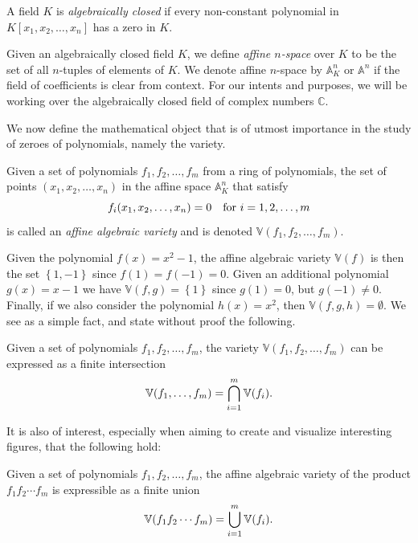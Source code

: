 \documentclass{article}
\newcommand{\C}{\ensuremath{\mathbb{C}}}
\newcommand{\A}{\ensuremath{\mathbb{A}}}
\newcommand{\V}{\ensuremath{\mathbb{V}}}
\begin{document}
    \begin{definition}
        A field $K$ is \emph{algebraically closed} if every non-constant
        polynomial in $K[x_1, x_2, \ldots, x_n]$ has a zero in $K$.
    \end{definition}
    Given an algebraically closed field $K$, we define \emph{affine
    $n$-space} over $K$ to be the set of all
    $n$-tuples of elements of $K$. We denote affine $n$-space by $\A_K^n$ or
    $\A^n$ if the field of coefficients is clear from context.  For our intents
    and purposes, we will be working over the algebraically closed field of
    complex numbers $\C$. 
    
    We now define the mathematical object that is of utmost importance in the
    study of zeroes of polynomials, namely the variety.
    \begin{definition}
        Given a set of polynomials $f_1, f_2, \ldots, f_m$ from a ring of
        polynomials, the set of points $(x_1, x_2, \ldots, x_n)$ in the affine
        space $\A_K^n$ that satisfy
        \begin{equation}
            \notag
            f_i(x_1, x_2, \ldots, x_n) = 0 \quad \text{for } i = 1, 2, \ldots, m
        \end{equation}
        is called an \emph{affine algebraic variety} and is denoted $\V(f_1,
        f_2, \ldots, f_m)$.
    \end{definition}

    Given the polynomial $f(x) = x^2 - 1$, the affine algebraic variety $\V(f)$
    is then the set $\left\{ 1, -1 \right\}$ since $f(1) = f(-1) = 0$. Given an
    additional polynomial $g(x) = x-1$ we have $\V(f, g) = \left\{ 1 \right\}$
    since $g(1) = 0$, but $g(-1) \neq 0$. Finally, if we also consider the
    polynomial $h(x) = x^2$, then $\V(f, g, h) = \emptyset$. We see as a simple
    fact, and state without proof the following.
    
    \begin{corollary}
        Given a set of polynomials $f_1, f_2, \ldots, f_m$, the variety
        $\V(f_1, f_2, \ldots, f_m)$ can be expressed as a finite intersection
        \begin{equation}
            \notag
            \V(f_1, \ldots, f_m) = \bigcap_{i=1}^{m} \V(f_i).
        \end{equation}
    \end{corollary}
    It is also of interest, especially when aiming to create and visualize
    interesting figures, that the following hold:
    \begin{corollary}
    Given a set of polynomials $f_1, f_2, \ldots, f_m$, the affine algebraic
    variety of the product $f_1f_2\cdots f_m$ is expressible as a finite union
    \begin{equation}
        \notag
        \V(f_1f_2\cdots f_m) = \bigcup_{i=1}^{m} \V(f_i).
    \end{equation}
    \end{corollary}
    
\end{document}
